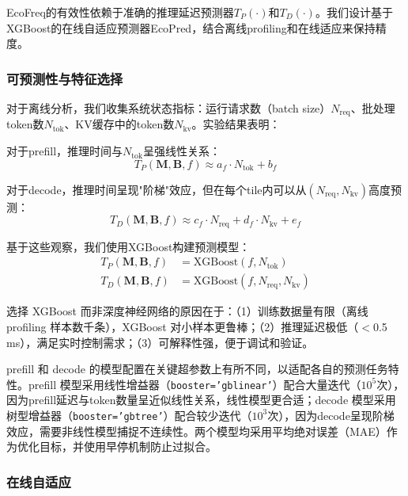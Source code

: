 EcoFreq的有效性依赖于准确的推理延迟预测器$T_P(\cdot)$和$T_D(\cdot)$。我们设计基于XGBoost的在线自适应预测器EcoPred，结合离线profiling和在线适应来保持精度。

\subsubsection{可预测性与特征选择}

对于离线分析，我们收集系统状态指标：运行请求数（batch size）$N_{\text{req}}$、批处理token数$N_{\text{tok}}$、KV缓存中的token数$N_{\text{kv}}$。实验结果表明：

对于prefill，推理时间与$N_{\text{tok}}$呈强线性关系：
\begin{equation}
    T_P \left(\mathbf{M}, \mathbf{B}, f \right) \approx a_f \cdot N_{\text{tok}} + b_f
\end{equation}

对于decode，推理时间呈现"阶梯"效应，但在每个tile内可以从$(N_{\text{req}}, N_{\text{kv}})$高度预测：
\begin{equation}
    T_D \left( \mathbf{M}, \mathbf{B}, f  \right) \approx c_f \cdot N_{\text{req}} + d_f \cdot N_{\text{kv}} + e_f
\end{equation}

基于这些观察，我们使用XGBoost构建预测模型：
\begin{align}
    T_P \left(\mathbf{M}, \mathbf{B}, f \right) &= \text{XGBoost}(f, N_{\text{tok}})\\
    T_D \left(\mathbf{M}, \mathbf{B}, f \right) &= \text{XGBoost}(f, N_{\text{req}}, N_{\text{kv}})
\end{align}

选择 XGBoost 而非深度神经网络的原因在于：（1）训练数据量有限（离线 profiling 样本数千条），XGBoost 对小样本更鲁棒；（2）推理延迟极低（$<$0.5 ms），满足实时控制需求；（3）可解释性强，便于调试和验证。

prefill 和 decode 的模型配置在关键超参数上有所不同，以适配各自的预测任务特性。prefill 模型采用线性增益器（\texttt{booster='gblinear'}）配合大量迭代（$10^5$次），因为prefill延迟与token数量呈近似线性关系，线性模型更合适；decode 模型采用树型增益器（\texttt{booster='gbtree'}）配合较少迭代（$10^3$次），因为decode呈现阶梯效应，需要非线性模型捕捉不连续性。两个模型均采用平均绝对误差（MAE）作为优化目标，并使用早停机制防止过拟合。

\subsubsection{在线自适应}

